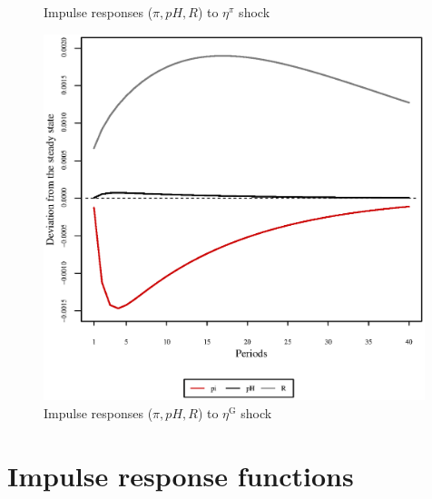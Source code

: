 \begin{figure}[h]
\begin{minipage}{0.5\textwidth}
\caption{Impulse responses ($\pi, {p\!H}, R$) to $\eta^{\pi}$ shock}
\end{minipage}
\end{figure}

\pagebreak

\begin{figure}[h]
\centering
\begin{minipage}{0.5\textwidth}
\vspace*{-3em}
\centering
\includegraphics[width=0.99\textwidth, scale=0.55]{plots/plot_70.eps}
\caption{Impulse responses ($\pi, {p\!H}, R$) to $\eta^{\mathrm{G}}$ shock}
\end{minipage}
\end{figure}

\pagebreak

\section{Impulse response functions}

